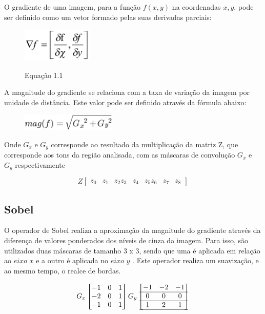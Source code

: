 \documentclass[
	12pt,				%
	oneside,			%
	a4paper,			%
	english,			%
	french,				%
	spanish,			%
	brazil,				%
	]{abntex2}
\begin{document}
O gradiente de uma imagem, para a função \(f(x,y)\) na coordenadas \(x,y\), pode ser definido como um vetor formado pelas suas derivadas parciais:

\begin{figure}[ht]
\centering
\includegraphics[width=0.3\textwidth]{imagens/gradiente.png}

Equação 1.1
\end{figure}

A magnitude do gradiente se relaciona com a taxa de variação da imagem por unidade de distância. Este valor pode ser definido através da fórmula abaixo:

\begin{figure}[ht]
\centering
\includegraphics[width=0.4\textwidth]{imagens/magnitude.png}
\end{figure}


Onde \(G_x\) e \(G_y\) corresponde ao resultado da multiplicação da matriz Z, que corresponde aos tons da região analisada, com as máscaras de convolução \(G_x\) e \(G_y\) respectivamente


\[
Z
\begin{bmatrix}
    z_0 & z_1 & z_2   
	z_3 & z_4 & z_5      
	z_6 & z_7 & z_8      
\end{bmatrix} 
\]

\subsection{Sobel}

O operador de Sobel realiza a aproximação da magnitude do gradiente através da diferença de valores ponderados dos níveis de cinza da imagem. Para isso, são utilizados duas máscaras de tamanho 3 x 3, sendo que uma é aplicada em relação ao \(eixo\) \(x\) e a outro é aplicada no \(eixo\) \(y\) \cite{pedriniSchwartz:2008}. Este operador realiza um suavização, e ao mesmo tempo, o realce de bordas.

\[
G_x
\begin{bmatrix}
    -1 & 0 & 1   \\ 
	-2 & 0 & 1   \\ 
	-1 & 0 & 1   \\ 
\end{bmatrix} 
G_y
\begin{bmatrix}
    -1 & -2 & -1   \\ \hline
	 0 &  0 & 0    \\ \hline   
	 1 &  2 & 1    \\ \hline   
\end{bmatrix} 
\]
\end{document}
